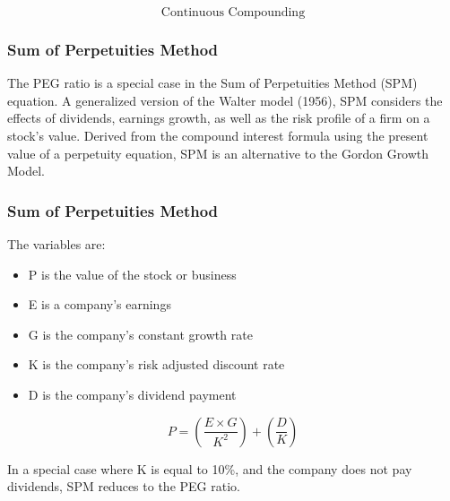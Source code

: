 \documentclass{beamer}
\begin{document}
\begin{frame}
\Large
\[
\mbox{Continuous Compounding}
\]
\end{frame}

\begin{frame}
\frametitle{Sum of Perpetuities Method}

The PEG ratio is a special case in the Sum of Perpetuities Method (SPM) equation. 
A generalized version of the Walter model (1956), 
SPM considers the effects of dividends, earnings growth, as well as 
the risk profile of a firm on a stock's value. 
Derived from the compound interest formula using the present value of a 
perpetuity equation, SPM is an alternative to the Gordon Growth Model. 

\end{frame}
\begin{frame}
\frametitle{Sum of Perpetuities Method}
The variables are:

\begin{itemize}
\item P is the value of the stock or business
\item E is a company's earnings
\item G is the company's constant growth rate
\item K is the company's risk adjusted discount rate
\item D is the company's dividend payment
\end{itemize}

\[ P = (\frac{E\times G}{K^2}) + (\frac{D}{K})\]

In a special case where K is equal to 10\%, and the company does not pay dividends, SPM reduces to the PEG ratio.

\end{frame}
\end{document}
